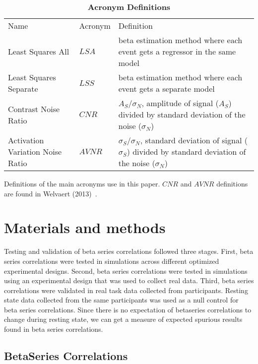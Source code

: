 \documentclass[10pt,letterpaper]{article}
\newlength\savedwidth
\newcommand\thickhline{\noalign{\global\savedwidth\arrayrulewidth\global\arrayrulewidth 2pt}%
\hline
\noalign{\global\arrayrulewidth\savedwidth}}
\begin{document}
\begin{table}[H]
  \begin{adjustwidth}{0in}{0in} %
  \centering
  \caption{
  {\bf Acronym Definitions}}
  \begin{tabular}{|l|l|p{60mm}|}
  \hline
  Name & Acronym & Definition\\ \thickhline
  Least Squares All & $LSA$ & beta estimation method where each event gets a regressor in the same model\\ \hline
  Least Squares Separate & $LSS$ & beta estimation method where each event gets a separate model\\ \hline
  Contrast Noise Ratio & $CNR$ & $A_S/\sigma_N$, amplitude of signal ($A_S$) divided by standard deviation of the noise ($\sigma_N$)\\ \hline
  Activation Variation Noise Ratio & $AVNR$ & $\sigma_S/\sigma_N$, standard deviation of signal ($\sigma_S$) divided by standard deviation of the noise ($\sigma_N$)\\ \hline
  \end{tabular}

  Definitions of the main acronyms use in this paper.
  $CNR$ and $AVNR$ definitions are found in Welvaert (2013)~\cite{Welvaert2013a}.
  \label{table0}
  \end{adjustwidth}
  \end{table}

\section*{Materials and methods}
\label{methods}

Testing and validation of beta series correlations followed three stages.
First, beta series correlations were tested in simulations across different
optimized experimental designs.
Second, beta series correlations were tested in simulations using an experimental
design that was used to collect real data.
Third, beta series correlations were validated in real task data collected from
participants.
Resting state data collected from the same participants was used as a null
control for beta series correlations.
Since there is no expectation of betaseries correlations to change
during resting state, we can get a measure of expected spurious results found
in beta series correlations.

\subsection*{BetaSeries Correlations}
\label{methods:bsc}
\end{document}

